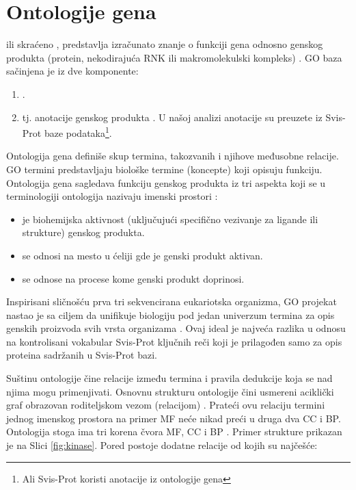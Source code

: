 \section{Ontologije gena}


  ili skraćeno , 
predstavlja izračunato znanje o funkciji gena odnosno genskog
produkta (protein, nekodirajuća RNK ili makromolekulski kompleks)
\parencite{GO2016}.
GO baza sačinjena je iz dve komponente:
\begin{enumerate}
  \item {}.
  \item {} tj. anotacije genskog produkta . U našoj
    analizi anotacije su preuzete iz Svis-Prot baze podataka\footnote{Ali Svis-Prot koristi anotacije iz ontologije gena}.
\end{enumerate}

Ontologija gena definiše skup termina, takozvanih 
 i njihove međusobne relacije. GO termini predstavljaju biološke
termine (koncepte) koji opisuju funkciju. Ontologija gena sagledava funkciju
genskog produkta iz tri aspekta koji se u terminologiji ontologija nazivaju
imenski prostori :
\begin{itemize}
  \item {} je biohemijska aktivnost (uključujući
    specifično vezivanje za ligande ili strukture) genskog produkta.
  \item {} se odnosi na mesto u ćeliji gde je
    genski produkt aktivan.
  \item {} se odnose na procese kome genski produkt
    doprinosi.
\end{itemize}

Inspirisani sličnošću prva tri sekvencirana eukariotska organizma, GO projekat
nastao je sa ciljem da  unifikuje biologiju pod jedan univerzum termina za opis
genskih proizvoda svih vrsta organizama \parencite{GO2000}. Ovaj ideal je najveća
razlika u odnosu na kontrolisani vokabular Svis-Prot ključnih reči koji je
prilagođen samo za opis proteina sadržanih u Svis-Prot bazi.

Suštinu ontologije čine relacije između termina i pravila dedukcije koja se nad
njima mogu primenjivati. Osnovnu strukturu ontologije čini usmereni aciklički
graf  obrazovan roditeljskom vezom (relacijom) . Prateći
ovu relaciju termini jednog imenskog prostora na primer MF neće nikad preći u
druga dva CC i BP.  Ontologija stoga ima tri korena čvora MF, CC i BP
\parencite{go_struktura}. Primer strukture prikazan je na
Slici \ref{fig:kinase}.  Pored  postoje dodatne relacije od kojih
su najčešće:

